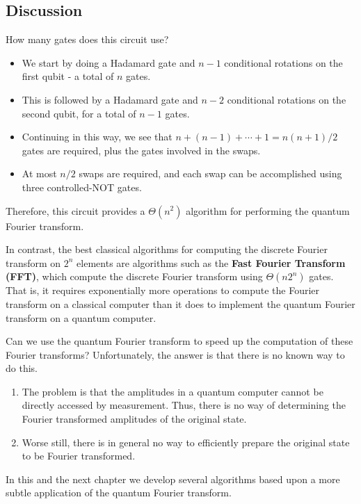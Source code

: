 \subsection{Discussion}

How many gates does this circuit use? 
\begin{itemize}
    \item We start by doing a Hadamard gate and $n-1$ conditional rotations on the first qubit - a total of $n$ gates.
    \item This is followed by a Hadamard gate and $n-2$ conditional rotations on the second qubit, for a total of $n-1$ gates.
    \item Continuing in this way, we see that $n+(n-1)+\cdots+1=n(n+1) / 2$ gates are required, plus the gates involved in the swaps.
    \item At most $n / 2$ swaps are required, and each swap can be accomplished using three controlled-NOT gates. 
\end{itemize}
Therefore, this circuit provides a $\Theta(n^{2})$ algorithm for performing the quantum Fourier transform.

In contrast, the best classical algorithms for computing the discrete Fourier transform on $2^{n}$ elements are algorithms such as the \textbf{Fast Fourier Transform (FFT)}, which compute the discrete Fourier transform using $\Theta\left(n 2^{n}\right)$ gates. That is, it requires exponentially more operations to compute the Fourier transform on a classical computer than it does to implement the quantum Fourier transform on a quantum computer.

Can we use the quantum Fourier transform to speed up the computation of these Fourier transforms? Unfortunately, the answer is that there is no known way to do this. 

\begin{enumerate}
    \item The problem is that the amplitudes in a quantum computer cannot be directly accessed by measurement. Thus, there is no way of determining the Fourier transformed amplitudes of the original state.
    \item Worse still, there is in general no way to efficiently prepare the original state to be Fourier transformed.
\end{enumerate}

In this and the next chapter we develop several algorithms based upon a more subtle application of the quantum Fourier transform.

